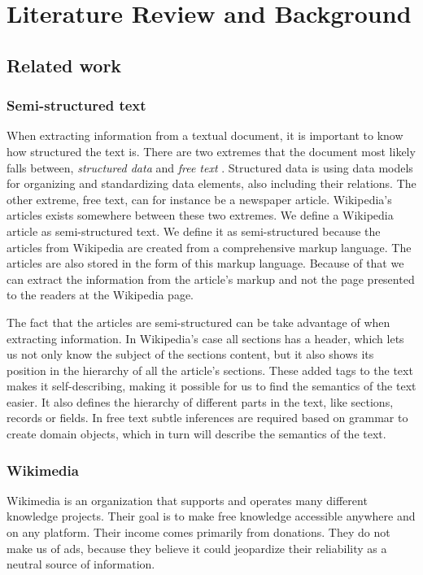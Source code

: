 
\chapter{Literature Review and Background}

\section{Related work}

\subsection{Semi-structured text}
When extracting information from a textual document, it is important to know how structured the text is. There are two extremes that the document most likely falls between, \textit{structured data} and \textit{free text}  \cite{semi-struc-text}. Structured data is using data models for organizing and standardizing data elements, also including their relations. The other extreme, free text, can for instance be a newspaper article. Wikipedia's articles exists somewhere between these two extremes. We define a Wikipedia article as semi-structured text. We define it as semi-structured because the articles from Wikipedia are created from a comprehensive markup language. The articles are also stored in the form of this markup language. Because of that we can extract the information from the article's markup and not the page presented to the readers at the Wikipedia page. 

The fact that the articles are semi-structured can be take advantage of when extracting information. In Wikipedia's case all sections has a header, which lets us not only know the subject of the sections content, but it also shows its position in the hierarchy of all the article's sections. These added tags to the text makes it self-describing, making it possible for us to find the semantics of the text easier. It also defines the hierarchy of different parts in the text, like sections, records or fields. In free text subtle inferences are required based on grammar to create domain objects, which in turn will describe the semantics of the text. 

\subsection{Wikimedia} \label{wikimedia}
Wikimedia \cite{wikimedia} is an organization that supports and operates many different knowledge projects. Their goal is to make free knowledge accessible anywhere and on any platform. Their income comes primarily from donations. They do not make us of ads, because they believe it could jeopardize their reliability as a neutral source of information.

